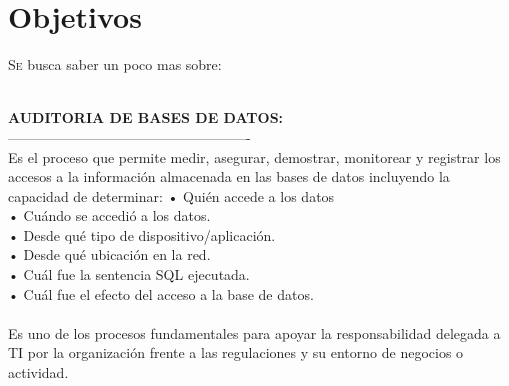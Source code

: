 \documentclass[twoside,twocolumn]{article}
\begin{document}
\section{Objetivos}
\begin{flushright}
\begin{itemize}
\lettrine[nindent=0em,lines=2]{S}e busca saber un poco mas sobre:

\textbf{}\\

\textbf{AUDITORIA DE BASES DE DATOS:}\\
----------------------------------------------------
\textbf{}\\
 Es el proceso que permite medir, asegurar, demostrar, monitorear y registrar los accesos a la información almacenada en las bases de datos incluyendo la capacidad de determinar:
•	Quién accede a los datos \textbf{}\\
•	Cuándo se accedió a los datos. \textbf{}\\
•	Desde qué tipo de dispositivo/aplicación. \textbf{}\\
•	Desde qué ubicación en la red. \textbf{}\\
•	Cuál fue la sentencia SQL ejecutada. \textbf{}\\
•	Cuál fue el efecto del acceso a la base de datos. \textbf{}\\
\textbf{}\\
Es uno de los procesos fundamentales para apoyar la responsabilidad delegada a TI por la organización frente a las regulaciones y su entorno de negocios o actividad.


\end{itemize}
\end{flushright}
\end{document}
